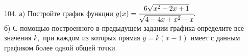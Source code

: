 104. а) Постройте график функции $g(x)=\cfrac{6\sqrt{x^2-2x+1}}{\sqrt{4-4x+x^2}-x}.$\\
б) С помощью построенного в предыдущем задании графика определите все значения $k,$ при каждом из которых прямая $y=k(x-1)$ имеет с данным графиком более одной общей точки.\\
